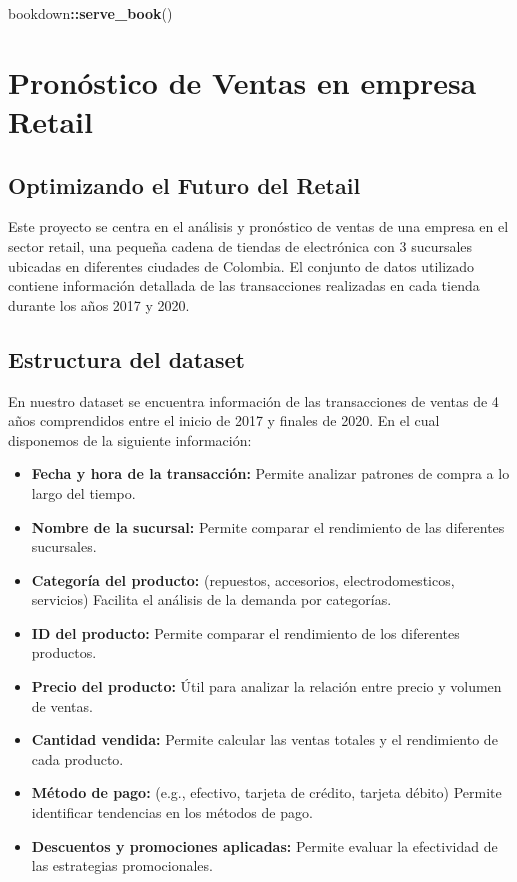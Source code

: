 \documentclass[
]{book}
\newenvironment{Shaded}{\begin{snugshade}}{\end{snugshade}}
\newcommand{\FunctionTok}[1]{\textcolor[rgb]{0.13,0.29,0.53}{\textbf{#1}}}
\newcommand{\NormalTok}[1]{#1}
\newcommand{\SpecialCharTok}[1]{\textcolor[rgb]{0.81,0.36,0.00}{\textbf{#1}}}
\providecommand{\tightlist}{%
  \setlength{\itemsep}{0pt}\setlength{\parskip}{0pt}}
\begin{document}
\begin{Shaded}
\begin{Highlighting}[]
\NormalTok{bookdown}\SpecialCharTok{::}\FunctionTok{serve\_book}\NormalTok{()}
\end{Highlighting}
\end{Shaded}

\chapter{Pronóstico de Ventas en empresa Retail}\label{pronuxf3stico-de-ventas-en-empresa-retail}

\section{Optimizando el Futuro del Retail}\label{optimizando-el-futuro-del-retail}

Este proyecto se centra en el análisis y pronóstico de ventas de una empresa en el sector retail, una pequeña cadena de tiendas de electrónica con 3 sucursales ubicadas en diferentes ciudades de Colombia. El conjunto de datos utilizado contiene información detallada de las transacciones realizadas en cada tienda durante los años 2017 y 2020.

\section{Estructura del dataset}\label{estructura-del-dataset}

En nuestro dataset se encuentra información de las transacciones de ventas de 4 años comprendidos entre el inicio de 2017 y finales de 2020. En el cual disponemos de la siguiente información:

\begin{itemize}
\tightlist
\item
  \textbf{Fecha y hora de la transacción:} Permite analizar patrones de compra a lo largo del tiempo.
\item
  \textbf{Nombre de la sucursal:} Permite comparar el rendimiento de las diferentes sucursales.
\item
  \textbf{Categoría del producto:} (repuestos, accesorios, electrodomesticos, servicios) Facilita el análisis de la demanda por categorías.
\item
  \textbf{ID del producto:} Permite comparar el rendimiento de los diferentes productos.
\item
  \textbf{Precio del producto:} Útil para analizar la relación entre precio y volumen de ventas.
\item
  \textbf{Cantidad vendida:} Permite calcular las ventas totales y el rendimiento de cada producto.
\item
  \textbf{Método de pago:} (e.g., efectivo, tarjeta de crédito, tarjeta débito) Permite identificar tendencias en los métodos de pago.
\item
  \textbf{Descuentos y promociones aplicadas:} Permite evaluar la efectividad de las estrategias promocionales.
\end{itemize}
\end{document}
